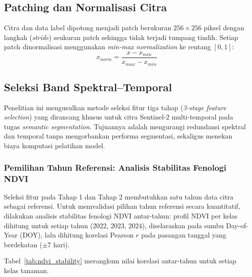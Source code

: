 \subsection{Patching dan Normalisasi Citra}
Citra dan data label dipotong menjadi patch berukuran $256\times256$ piksel dengan langkah (\textit{stride}) seukuran patch sehingga tidak terjadi tumpang tindih.
Setiap patch dinormalisasi menggunakan \textit{min-max normalization} ke rentang $[0, 1]$:
\begin{equation}
    x_{norm} = \frac{x - x_{min}}{x_{max} - x_{min}}
\end{equation}

\subsection{Seleksi Band Spektral--Temporal}

Penelitian ini mengusulkan metode seleksi fitur tiga tahap (\textit{3-stage feature selection}) yang dirancang khusus untuk citra Sentinel-2 multi-temporal pada tugas \textit{semantic segmentation}. Tujuannya adalah mengurangi redundansi spektral dan temporal tanpa mengorbankan performa segmentasi, sekaligus menekan biaya komputasi pelatihan model.

\subsubsection{Pemilihan Tahun Referensi: Analisis Stabilitas Fenologi NDVI}
\label{subsubsec:tahun_referensi}

Seleksi fitur pada Tahap 1 dan Tahap 2 membutuhkan satu tahun data citra sebagai referensi.
Untuk memvalidasi pilihan tahun referensi secara kuantitatif, dilakukan analisis stabilitas fenologi NDVI antar-tahun: profil NDVI per kelas dihitung untuk setiap tahun (2022, 2023, 2024), diselaraskan pada sumbu Day-of-Year (DOY), lalu dihitung korelasi Pearson $r$ pada pasangan tanggal yang berdekatan ($\pm$7 hari).

Tabel~\ref{tab:ndvi_stability} merangkum nilai korelasi antar-tahun untuk setiap kelas tanaman.

